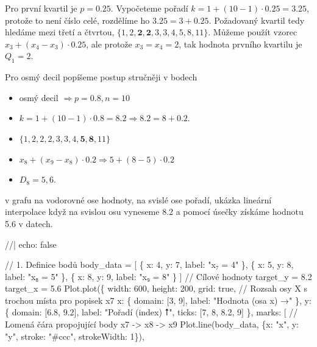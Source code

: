 \documentclass[
  czech,
  11pt,
  letterpaper,
  DIV=11,
  numbers=noendperiod]{scrreprt}
\newenvironment{Shaded}{\begin{snugshade}}{\end{snugshade}}
\newcommand{\NormalTok}[1]{\textcolor[rgb]{0.00,0.23,0.31}{#1}}
\providecommand{\tightlist}{%
  \setlength{\itemsep}{0pt}\setlength{\parskip}{0pt}}
\begin{document}
\begin{tcolorbox}[enhanced jigsaw, arc=.35mm, bottomrule=.15mm, bottomtitle=1mm, breakable, colback=white, colbacktitle=quarto-callout-note-color!10!white, colframe=quarto-callout-note-color-frame, coltitle=black, left=2mm, leftrule=.75mm, opacityback=0, opacitybacktitle=0.6, rightrule=.15mm, title=\textcolor{quarto-callout-note-color}{\faInfo}\hspace{0.5em}{Určete první kvartil a osmý decil}, titlerule=0mm, toprule=.15mm, toptitle=1mm]

Pro první kvartil je \(p=0.25\). Vypočeteme pořadí
\(k=1+(10-1)\cdot 0.25=3.25\), protože to není číslo celé, rozdělíme ho
\(3.25 = 3 + 0.25\). Požadovaný kvartil tedy hledáme mezi třetí a
čtvrtou, \(\{1,  2, \mathbf{ 2, 2}, 3, 3, 4, 5, 8, 11\}\). Můžeme použít
vzorec \(x_3+(x_4-x_3)\cdot 0.25\), ale protože \(x_3=x_4=2\), tak
hodnota prvního kvartilu je \(Q_1=2\).

Pro osmý decil popíšeme postup stručněji v bodech

\begin{itemize}
\tightlist
\item
  osmý decil \(\Longrightarrow p=0.8, n=10\)
\item
  \(k=1+(10-1)\cdot 0.8=8.2 \Longrightarrow 8.2 = 8 + 0.2\).
\item
  \(\{1, 2, 2, 2, 3, 3, 4, \mathbf{ 5, 8}, 11\}\)
\item
  \(x_8+(x_9-x_8)\cdot 0.2 \Longrightarrow 5+(8-5)\cdot0.2\)
\item
  \(D_8=5,6\).
\end{itemize}

v grafu na vodorovné ose hodnoty, na svislé ose pořadí, ukázka lineární
interpolace když na svislou osu vyneseme 8.2 a pomocí úsečky získáme
hodnotu 5.6 v datech.

\begin{Shaded}
\begin{Highlighting}[]
\NormalTok{//| echo: false}

\NormalTok{// 1. Definice bodů}
\NormalTok{body\_data = [}
\NormalTok{  \{ x: 4, y: 7, label: "x₇ = 4" \},}
\NormalTok{  \{ x: 5, y: 8, label: "x₈ = 5" \},}
\NormalTok{  \{ x: 8, y: 9, label: "x₉ = 8" \}}
\NormalTok{]}
\NormalTok{// Cílové hodnoty}
\NormalTok{target\_y = 8.2}
\NormalTok{target\_x = 5.6}
\NormalTok{Plot.plot(\{}
\NormalTok{  width: 600,}
\NormalTok{  height: 200,}
\NormalTok{  grid: true,}
\NormalTok{  // Rozsah osy X s trochou místa pro popisek x7}
\NormalTok{  x: \{ domain: [3, 9], label: "Hodnota (osa x) →" \},}
\NormalTok{  y: \{ domain: [6.8, 9.2], label: "Pořadí (index) ⭡", ticks: [7, 8, 8.2, 9] \},}
\NormalTok{  marks: [}
\NormalTok{    // Lomená čára propojující body x7 {-}\textgreater{} x8 {-}\textgreater{} x9}
\NormalTok{    Plot.line(body\_data, \{x: "x", y: "y", stroke: "\#ccc", strokeWidth: 1\}),}


\end{Highlighting}
\end{Shaded}
\end{tcolorbox}
\end{document}
